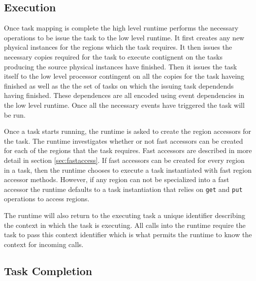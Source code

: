 \subsection{Execution}
\label{subsec:execution}
Once task mapping is complete the high level runtime performs the necessary operations
to be issue the task to the low level runtime.  It first creates any new physical instances
for the regions which the task requires.  It then issues the necessary copies required
for the task to execute contignent on the tasks producing the source physical instances
have finished.  Then it issues the task itself to the low level processor contingent
on all the copies for the task haveing finished as well as the the set of tasks
on which the issuing task dependends having finished.  These dependences are all encoded
using event dependencies in the low level runtime.  Once all the necessary events
have triggered the task will be run.

Once a task starts running, the runtime is asked to create the region accessors for
the task.  The runtime investigates whether or not fast accessors can be created for
each of the regions that the task requires.  Fast accessors are described in more
detail in section \ref{sec:fastaccess}.  If fast accessors can be created for every
region in a task, then the runtime chooses to execute a task instantiated with fast
region accessor methods.  However, if any region can not be specialized into a fast
accessor the runtime defaults to a task instantiation that relies on {\tt get} and
{\tt put} operations to access regions.

The runtime will also return to the executing task a unique identifier describing the
context in which the task is executing.  All calls into the runtime require the task
to pass this context identifier which is what permits the runtime to know the context
for incoming calls.  

\subsection{Task Completion}
\label{subsec:cleanup}


